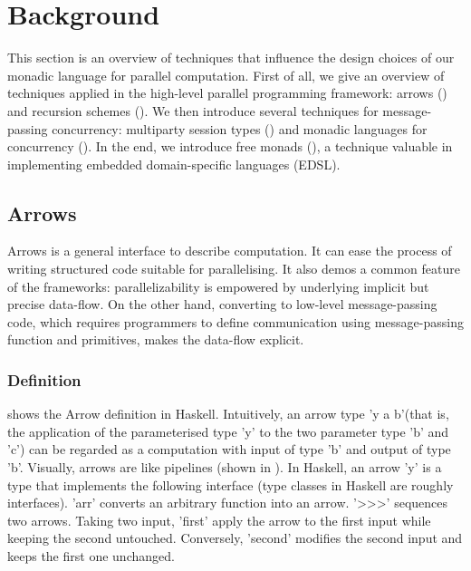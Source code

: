 \chapter{Background} \label{b}
This section is an overview of techniques that influence the design choices of our monadic language for parallel computation. First of all, we give an overview of techniques applied in the high-level parallel programming framework: arrows () and recursion schemes (). We then introduce several techniques for message-passing concurrency: multiparty session types () and monadic languages for concurrency (). In the end, we introduce free monads (), a technique valuable in implementing embedded domain-specific languages (EDSL).

\section{Arrows} \label{b:arrows}
Arrows is a general interface to describe computation. It can ease the process of writing structured code suitable for parallelising. It also demos a common feature of the frameworks: parallelizability is empowered by underlying implicit but precise data-flow. On the other hand, converting to low-level message-passing code, which requires programmers to define communication using message-passing function and primitives, makes the data-flow explicit.
\subsection{Definition}
 shows the Arrow definition in Haskell. Intuitively, an arrow type 'y a b'(that is, the application of the parameterised type 'y' to the two parameter type 'b' and 'c') can be regarded as a computation with input of type 'b' and output of type 'b'\cite{hughesGeneralisingMonadsArrows2000}. Visually, arrows are like pipelines (shown in ). In Haskell, an arrow 'y' is a type that implements the following interface (type classes in Haskell are roughly interfaces). 'arr' converts an arbitrary function into an arrow. '>>>' sequences two arrows. Taking two input,  'first' apply the arrow to the first input while keeping the second untouched. Conversely, 'second' modifies the second input and keeps the first one unchanged.

